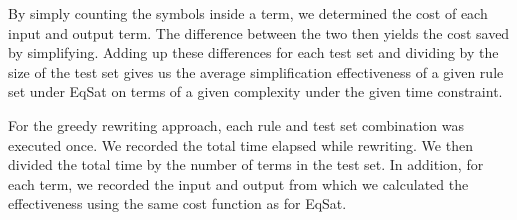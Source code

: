 By simply counting the symbols inside a term, we determined the cost of each input and output term. The difference between the two then yields the cost saved by simplifying. Adding up these differences for each test set and dividing by the size of the test set gives us the average simplification effectiveness of a given rule set under EqSat on terms of a given complexity under the given time constraint.

For the greedy rewriting approach, each rule and test set combination was executed once. We recorded the total time elapsed while rewriting. We then divided the total time by the number of terms in the test set. In addition, for each term, we recorded the input and output from which we calculated the effectiveness using the same cost function as for EqSat.